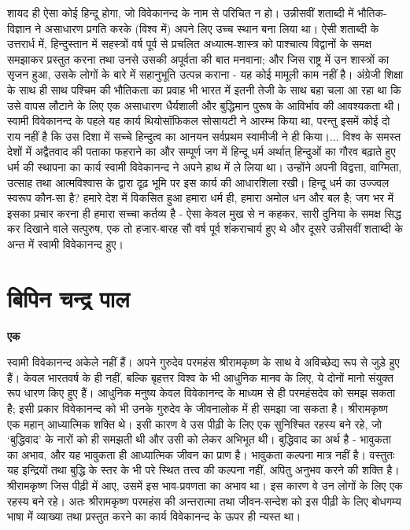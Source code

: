 शायद ही ऐसा कोई हिन्दू होगा, जो विवेकानन्द के नाम से परिचित न हो। उन्नीसवीं शताब्दी में भौतिक-विज्ञान ने असाधारण प्रगति करके (विश्व में) अपने लिए उच्च स्थान बना लिया था। ऐसी शताब्दी के उत्तरार्ध में, हिन्दुस्तान में सहस्त्रों वर्ष पूर्व से प्रचलित अध्यात्म-शास्त्र को पाश्चात्य विद्वानों के समक्ष समझाकर प्रस्तुत करना तथा उनसे उसकी अपूर्वता की बात मनवाना; और जिस राष्ट्र में उन शास्त्रों का सृजन हुआ, उसके लोगों के बारे में सहानुभूति उत्पन्न कराना - यह कोई मामूली काम नहीं है। अंग्रेजी शिक्षा के साथ ही साथ पश्चिम की भौतिकता का प्रवाह भी भारत में इतनी तेजी के साथ बहा चला आ रहा था कि उसे वापस लौटाने के लिए एक असाधारण धैर्यशाली और बुद्धिमान पुरूष के आविर्भाव की आवश्यकता थी। स्वामी विवेकानन्द के पहले यह कार्य थियोसॉफिकल सोसायटी ने आरम्भ किया था, परन्तु इसमें कोई दो राय नहीं है कि उस दिशा में सच्चे हिन्दुत्व का आनयन सर्वप्रथम स्वामीजी ने ही किया।... विश्व के समस्त देशों में अद्वैतवाद की पताका फहराने का और सम्पूर्ण जग में हिन्दू धर्म अर्थात् हिन्दुओं का गौरव बढ़ाते हुए धर्म की स्थापना का कार्य स्वामी विवेकानन्द ने अपने हाथ में ले लिया था। उन्होंने अपनी विद्वत्ता, वाग्मिता, उत्साह तथा आत्मविश्वास के द्वारा दृढ़ भूमि पर इस कार्य की आधारशिला रखी। हिन्दू धर्म का उज्ज्वल स्वरूप कौन-सा है? हमारे देश में विकसित हुआ हमारा धर्म ही, हमारा अमोल धन और बल है; जग भर में इसका प्रचार करना ही हमारा सच्चा कर्तव्य है - ऐसा केवल मुख से न कहकर, सारी दुनिया के समक्ष सिद्ध कर दिखाने वाले सत्पुरुष, एक तो हजार-बारह सौ वर्ष पूर्व शंकराचार्य हुए थे और दूसरे उन्नीसवीं शताब्दी के अन्त में स्वामी विवेकानन्द हुए।


\section*{बिपिन चन्द्र पाल}


\centerline{\textbf{एक}}

स्वामी विवेकानन्द अकेले नहीं हैं। अपने गुरुदेव परमहंस श्रीरामकृष्ण के साथ वे अविच्छेद्य रूप से जुड़े हुए हैं। केवल भारतवर्ष के ही नहीं, बल्कि बृहत्तर विश्व के भी आधुनिक मानव के लिए, ये दोनों मानो संयुक्त रूप धारण किए हुए हैं। आधुनिक मनुष्य केवल विवेकानन्द के माध्यम से ही परमहंसदेव को समझ सकता है; इसी प्रकार विवेकानन्द को भी उनके गुरुदेव के जीवनालोक में ही समझा जा सकता है। श्रीरामकृष्ण एक महान् आध्यात्मिक शक्ति थे। इसी कारण वे उस पीढ़ी के लिए एक सुनिश्चित रहस्य बने रहे, जो ‘बुद्धिवाद’ के नारों को ही समझती थी और उसी को लेकर अभिभूत थी। बुद्धिवाद का अर्थ है - भावुकता का अभाव, और यह भावुकता ही आध्यात्मिक जीवन का प्राण है। भावुकता कल्पना मात्र नहीं है। वस्तुतः यह इन्द्रियों तथा बुद्धि के स्तर के भी परे स्थित तत्त्व की कल्पना नहीं, अपितु अनुभव करने की शक्ति है। श्रीरामकृष्ण जिस पीढ़ी में आए, उसमें इस भाव-प्रवणता का अभाव था। इस कारण वे उन लोगों के लिए एक रहस्य बने रहे। अतः श्रीरामकृष्ण परमहंस की अन्तरात्मा तथा जीवन-सन्देश को इस पीढ़ी के लिए बोधगम्य भाषा में व्याख्या तथा प्रस्तुत करने का कार्य विवेकानन्द के ऊपर ही न्यस्त था। 


